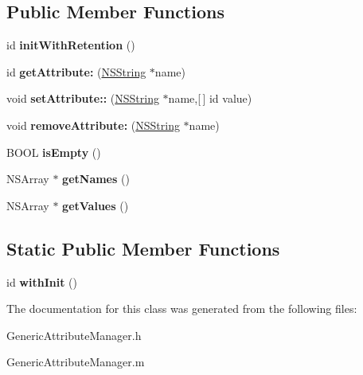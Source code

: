 \subsection*{\-Public \-Member \-Functions}
\begin{DoxyCompactItemize}
\item 
\hypertarget{interface_generic_attribute_manager_a37180e423a015e537d137e1b789f9e32}{
id {\bfseries init\-With\-Retention} ()}
\label{interface_generic_attribute_manager_a37180e423a015e537d137e1b789f9e32}

\item 
\hypertarget{interface_generic_attribute_manager_a48a4f041fb63fe321402719d8517e7e7}{
id {\bfseries get\-Attribute\-:} (\hyperlink{class_n_s_string}{\-N\-S\-String} $\ast$name)}
\label{interface_generic_attribute_manager_a48a4f041fb63fe321402719d8517e7e7}

\item 
\hypertarget{interface_generic_attribute_manager_aa82af1f6ef460bae067988d1c510d4d3}{
void {\bfseries set\-Attribute\-::} (\hyperlink{class_n_s_string}{\-N\-S\-String} $\ast$name,\mbox{[}$\,$\mbox{]} id value)}
\label{interface_generic_attribute_manager_aa82af1f6ef460bae067988d1c510d4d3}

\item 
\hypertarget{interface_generic_attribute_manager_ab44db9312bc722bcfcb8180225b427b2}{
void {\bfseries remove\-Attribute\-:} (\hyperlink{class_n_s_string}{\-N\-S\-String} $\ast$name)}
\label{interface_generic_attribute_manager_ab44db9312bc722bcfcb8180225b427b2}

\item 
\hypertarget{interface_generic_attribute_manager_a0828431447066c344cfcfb4e911bec84}{
\-B\-O\-O\-L {\bfseries is\-Empty} ()}
\label{interface_generic_attribute_manager_a0828431447066c344cfcfb4e911bec84}

\item 
\hypertarget{interface_generic_attribute_manager_a863edf93d3904d555fe7ff5e0a00645a}{
\-N\-S\-Array $\ast$ {\bfseries get\-Names} ()}
\label{interface_generic_attribute_manager_a863edf93d3904d555fe7ff5e0a00645a}

\item 
\hypertarget{interface_generic_attribute_manager_ab1f90bc5bd7fd90283faa439aaaddb08}{
\-N\-S\-Array $\ast$ {\bfseries get\-Values} ()}
\label{interface_generic_attribute_manager_ab1f90bc5bd7fd90283faa439aaaddb08}

\end{DoxyCompactItemize}
\subsection*{\-Static \-Public \-Member \-Functions}
\begin{DoxyCompactItemize}
\item 
\hypertarget{interface_generic_attribute_manager_afeda66d24fb02db2fcd1cf1eb682dc98}{
id {\bfseries with\-Init} ()}
\label{interface_generic_attribute_manager_afeda66d24fb02db2fcd1cf1eb682dc98}

\end{DoxyCompactItemize}


\-The documentation for this class was generated from the following files\-:\begin{DoxyCompactItemize}
\item 
\-Generic\-Attribute\-Manager.\-h\item 
\-Generic\-Attribute\-Manager.\-m\end{DoxyCompactItemize}
